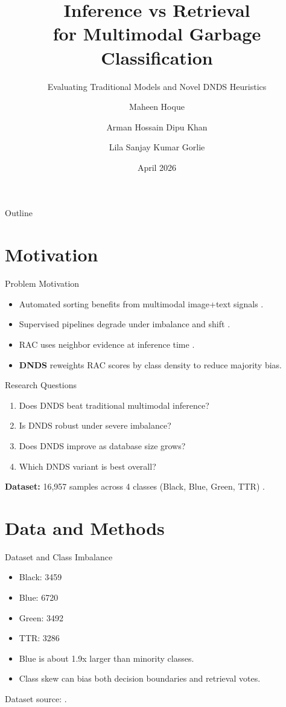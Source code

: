 \documentclass[aspectratio=169]{beamer}
\title[Inference vs Retrieval]{Inference vs Retrieval\\for Multimodal Garbage Classification}
\subtitle{Evaluating Traditional Models and Novel DNDS Heuristics}
\author{Maheen Hoque \and Arman Hossain Dipu Khan \and Lila Sanjay Kumar Gorlie}
\institute{University of Calgary}
\date{April 2026}
\begin{document}
\begin{frame}
  \titlepage
\end{frame}

\begin{frame}{Outline}
  \tableofcontents
\end{frame}

\section{Motivation}
\begin{frame}{Problem Motivation}
\begin{itemize}
  \item Automated sorting benefits from multimodal image+text signals \cite{alexakis2025enhanced}.
  \item Supervised pipelines degrade under imbalance and shift \cite{islam2026learning}.
  \item RAC uses neighbor evidence at inference time \cite{li2024kra}.
  \item \textbf{DNDS} reweights RAC scores by class density to reduce majority bias.
\end{itemize}
\end{frame}

\begin{frame}{Research Questions}
\begin{enumerate}
  \item Does DNDS beat traditional multimodal inference?
  \item Is DNDS robust under severe imbalance?
  \item Does DNDS improve as database size grows?
  \item Which DNDS variant is best overall?
\end{enumerate}
\vspace{4pt}
\textbf{Dataset:} 16,957 samples across 4 classes (Black, Blue, Green, TTR) \cite{cazarin2025garbage}.
\end{frame}

\section{Data and Methods}
\begin{frame}{Dataset and Class Imbalance}
\begin{itemize}
  \item Black: 3459
  \item Blue: 6720
  \item Green: 3492
  \item TTR: 3286
  \item Blue is about 1.9x larger than minority classes.
  \item Class skew can bias both decision boundaries and retrieval votes.
\end{itemize}
\vspace{2pt}
{\scriptsize Dataset source: \cite{cazarin2025garbage}.}
\end{frame}
\end{document}

